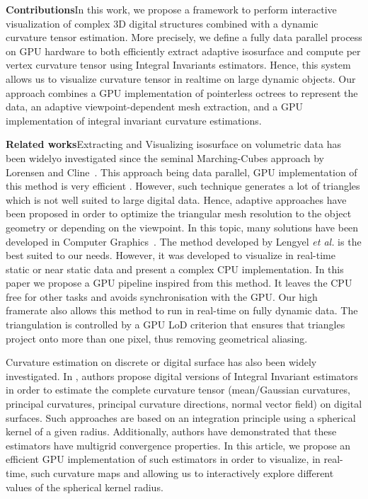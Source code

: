 \documentclass{llncs}
\begin{document}
\noindent\textbf{Contributions}\quad In this work, we propose a
framework to perform interactive visualization of complex 3D digital
structures combined with a dynamic curvature tensor estimation. More
precisely, we define a fully data parallel process on GPU hardware to
both efficiently extract adaptive isosurface and compute per vertex
curvature tensor using Integral Invariants estimators. Hence, this
system allows us to visualize curvature tensor in realtime on large
dynamic objects. Our approach combines a GPU implementation of
pointerless octrees to represent the data, an adaptive
viewpoint-dependent mesh extraction, and a GPU implementation of
integral invariant curvature estimations.


\vspace{0.2cm}

\sloppy\noindent\textbf{Related works}\quad Extracting and Visualizing
isosurface on volumetric data has been widelyo investigated since the
seminal Marching-Cubes approach by Lorensen and
Cline~\cite{lorensen1987marching}. This approach being data parallel,
GPU implementation of this method is very efficient
\cite{tatarchuk2007real}. However, such technique generates a lot of
triangles which is not well suited to large digital data. Hence,
adaptive approaches have been proposed in order to optimize the
triangular mesh resolution to the object geometry or depending on the
viewpoint. In this topic, many solutions have been developed in
Computer
Graphics~\cite{shu1995adaptive,schaefer2004dual,lengyel2010voxel,DBLP:journals/cgf/LewinerMPPL10,DBLP:journals/cvgip/LobelloDD14}.
The method developed by Lengyel \textit{et al.}
\cite{lengyel2010voxel} is the best suited to our needs.  However, it
was developed to visualize in real-time static or near static data and
present a complex CPU implementation.  In this paper we propose a GPU
pipeline inspired from this method.  It leaves the CPU free for other
tasks and avoids synchronisation with the GPU.  Our high framerate
also allows this method to run in real-time on fully dynamic data.
The triangulation is controlled by a GPU LoD criterion that ensures
that triangles project onto more than one pixel, thus removing
geometrical aliasing.

Curvature estimation on discrete or digital surface has also been
widely investigated. In \cite{CVIU2014}, authors propose digital
versions of Integral Invariant estimators
\cite{Pottmann2007,Pottmann2009} in order to estimate the complete
curvature tensor (mean/Gaussian curvatures, principal curvatures,
principal curvature directions, normal vector field) on digital
surfaces. Such approaches are based on an integration principle using
a spherical kernel of a given radius. Additionally, authors have
demonstrated that these estimators have multigrid convergence
properties. In this article, we propose an efficient GPU
implementation of such estimators in order to visualize, in real-time,
such curvature maps and allowing us to interactively explore different
values of the spherical kernel radius.
\end{document}
